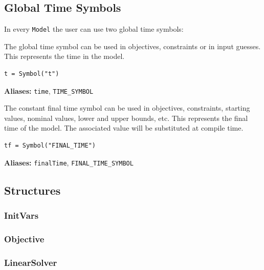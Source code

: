 \documentclass[12pt]{article}
\begin{document}
	\subsection{Global Time Symbols}
	\label{c:globaltime}
	In every \texttt{Model} the user can use two global time symbols:
	
	\begin{mdframed}[backgroundcolor=gray!10, roundcorner=10pt, linewidth=1pt]
		
		The global time symbol can be used in objectives, constraints or in input guesses. This represents the time in the model.
		
		\begin{lstlisting}
t = Symbol("t")
		\end{lstlisting}
		\label{timeSymbol}

		\textbf{Aliases:} \texttt{time}, \texttt{TIME\_SYMBOL}
	\end{mdframed}
	
	\begin{mdframed}[backgroundcolor=gray!10, roundcorner=10pt, linewidth=1pt]
		
		The constant final time symbol can be used in objectives, constraints, starting values, nominal values, lower and upper bounds, etc.
		This represents the final time of the model. The associated value will be substituted at compile time.
		
		\begin{lstlisting}
tf = Symbol("FINAL_TIME")
		\end{lstlisting}
		\label{finalTimeSymbol}
		
		\textbf{Aliases:} \texttt{finalTime}, \texttt{FINAL\_TIME\_SYMBOL}
	\end{mdframed}
	
	\subsection{Structures}

	\subsubsection{InitVars}
	\label{c:initVarsEnum}
	
	\subsubsection{Objective}
	\label{c:Objective}
	
	\subsubsection{LinearSolver}
	\label{c:LinearSolver}
	
\end{document}

